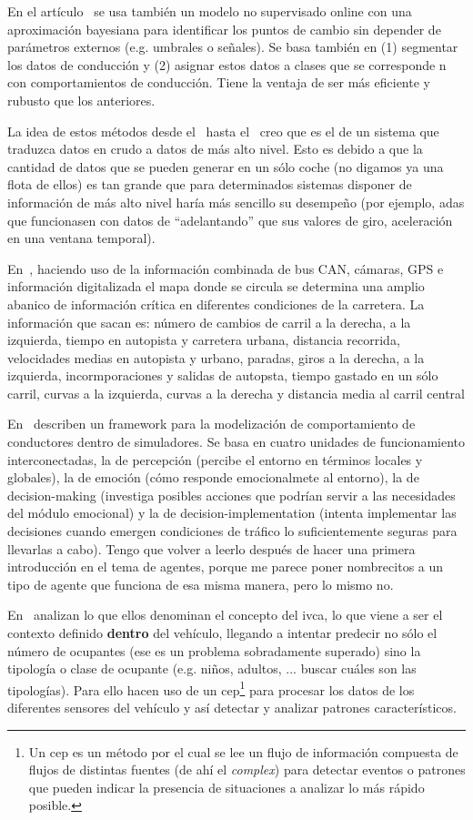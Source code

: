 En el artículo~\cite{bender2015unsupervised} se usa también un modelo no supervisado online con una aproximación bayesiana para identificar los puntos de cambio sin depender de parámetros externos (e.g. umbrales o señales). Se basa también en (1) segmentar los datos de conducción y (2) asignar estos datos a clases que se corresponde n con comportamientos de conducción. Tiene la ventaja de ser más eficiente y rubusto que los anteriores.

La idea de estos métodos desde el~\cite{sekizawa2007modeling} hasta el~\cite{bender2015unsupervised} creo que es el de un sistema que traduzca datos en crudo a datos de más alto nivel. Esto es debido a que la cantidad de datos que se pueden generar en un sólo coche (no digamos ya una flota de ellos) es tan grande que para determinados sistemas disponer de información de más alto nivel haría más sencillo su desempeño (por ejemplo, \gls{adas} que funcionasen con datos de \enquote{adelantando} que sus valores de giro, aceleración en una ventana temporal).

En~\cite{satzoda2013towards}, haciendo uso de la información combinada de bus CAN, cámaras, GPS e información digitalizada el mapa donde se circula se determina una amplio abanico de información crítica en diferentes condiciones de la carretera. La información que sacan es: número de cambios de carril a la derecha, a la izquierda, tiempo en autopista y carretera urbana, distancia recorrida, velocidades medias en autopista y urbano, paradas, giros a la derecha, a la izquierda, incormporaciones y salidas de autopsta, tiempo gastado en un sólo carril, curvas a la izquierda, curvas a la derecha y distancia media al carril central

En~\cite{al2001framework} describen un framework para la modelización de comportamiento de conductores dentro de simuladores. Se basa en cuatro unidades de funcionamiento interconectadas, la de percepción (percibe el entorno en términos locales y globales), la de emoción (cómo responde emocionalmete al entorno), la de decision-making (investiga posibles acciones que podrían servir a las necesidades del módulo emocional) y la de decision-implementation (intenta implementar las decisiones cuando emergen condiciones de tráfico lo suficientemente seguras para llevarlas a cabo). Tengo que volver a leerlo después de hacer una primera introducción en el tema de agentes, porque me parece poner nombrecitos a un tipo de agente que funciona de esa misma manera, pero lo mismo no.

En~\cite{terroso2015complex} analizan lo que ellos denominan el concepto del \gls{ivca}, lo que viene a ser el contexto definido \textbf{dentro} del vehículo, llegando a intentar predecir no sólo el número de ocupantes (ese es un problema sobradamente superado) sino la tipología o clase de ocupante (e.g. niños, adultos, ... \TODO buscar cuáles son las tipologías). Para ello hacen uso de un \gls{cep}\footnote{Un \gls{cep} es un método por el cual se lee un flujo de información compuesta de flujos de distintas fuentes (de ahí el \textit{complex}) para detectar eventos o patrones que pueden indicar la presencia de situaciones a analizar lo más rápido posible.} para procesar los datos de los diferentes sensores del vehículo y así detectar y analizar patrones característicos.

